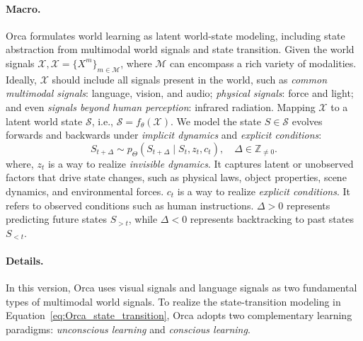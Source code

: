 \documentclass{llmxive}
\begin{document}
\paragraph{Macro.} Orca formulates world learning as latent world-state modeling, including state abstraction from multimodal world signals and state transition.
Given the world signals $\mathcal{X}, \mathcal{X}=\{X^{m}\}_{m\in\mathcal{M}}$, where $\mathcal{M}$ can encompass a rich variety of modalities. Ideally, $\mathcal{X}$ should include all signals present in the world, such as \textit{common multimodal signals}: language, vision, and audio; \textit{physical signals}: force and light; and even \textit{signals beyond human perception}: infrared radiation. Mapping $\mathcal{X}$ to a latent world state $\mathcal{S}$, i.e., $\mathcal{S} = f_{\theta}(\mathcal{X}).$
We model the state $S\in \mathcal{S}$ evolves forwards and backwards under \textit{implicit dynamics} and \textit{explicit conditions}:
\begin{equation}
\label{eq:Orca_state_transition}
    S_{t+\Delta}\sim p_{\Theta}
    \left(S_{t+\Delta}\mid S_t,z_t,c_t\right),
    \quad \Delta\in\mathbb{Z}_{\ne 0}.
\end{equation}
where, $z_t$ is a way to realize \textit{invisible dynamics}. It captures latent or unobserved factors that drive state changes, such as physical laws, object properties, scene dynamics, and environmental forces. $c_t$ is a way to realize \textit{explicit conditions}. It refers to observed conditions such as human instructions. $\Delta>0$ represents predicting future states $S_{> t}$, while $\Delta<0$ represents backtracking to past states $S_{< t}$. 



\paragraph{Details.} 
In this version, Orca uses visual signals and language signals as two fundamental types of multimodal world signals.
To realize the state-transition modeling in Equation~\ref{eq:Orca_state_transition}, Orca adopts two complementary learning paradigms: \textit{unconscious learning} and \textit{conscious learning}.
\end{document}
